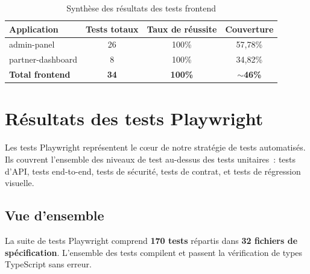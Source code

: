 \begin{table}[H]
\centering
\caption{Synth\`{e}se des r\'{e}sultats des tests frontend}
\label{tab:synthese-frontend}
\begin{tabularx}{\textwidth}{|X|c|c|c|}
\hline
\rowcolor{speedlineBlue!10}
\textbf{Application} & \textbf{Tests totaux} & \textbf{Taux de r\'{e}ussite} & \textbf{Couverture} \\
\hline
admin-panel & 26 & 100\% & 57,78\% \\
\hline
partner-dashboard & 8 & 100\% & 34,82\% \\
\hline
\rowcolor{speedlineGreen!10}
\textbf{Total frontend} & \textbf{34} & \textbf{100\%} & \textbf{$\sim$46\%} \\
\hline
\end{tabularx}
\end{table}

\section{R\'{e}sultats des tests Playwright}
\label{sec:resultats-playwright}

Les tests Playwright repr\'{e}sentent le c\oe ur de notre strat\'{e}gie de tests
automatis\'{e}s. Ils couvrent l'ensemble des niveaux de test au-dessus des
tests unitaires~: tests d'API, tests end-to-end, tests de s\'{e}curit\'{e},
tests de contrat, et tests de r\'{e}gression visuelle.

\subsection{Vue d'ensemble}

La suite de tests Playwright comprend \textbf{170 tests} r\'{e}partis dans
\textbf{32 fichiers de sp\'{e}cification}. L'ensemble des tests compilent
et passent la v\'{e}rification de types TypeScript sans erreur.

